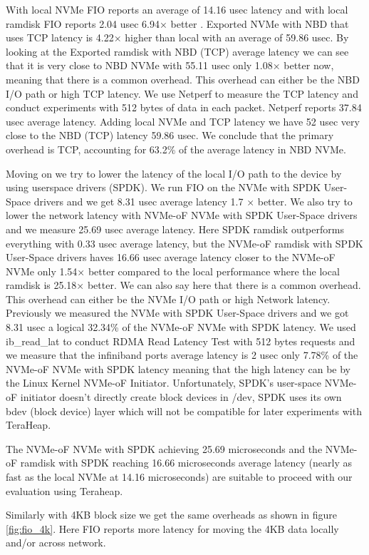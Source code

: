 {With local NVMe  FIO reports an average of 14.16 usec  latency and
with local ramdisk FIO reports 2.04 usec 6.94× better . Exported NVMe  with NBD that uses TCP
 latency is 4.22× higher than local with an average of 59.86 usec. By
looking at the Exported ramdisk with NBD (TCP) average latency we can see that
it is very close to NBD NVMe with 55.11 usec only 1.08× better now, meaning that
there is a common overhead. This overhead can either be the NBD I/O path or high
TCP latency. We use Netperf to measure the TCP latency and conduct experiments
with 512 bytes of data in each packet. Netperf reports 37.84 usec average
latency. Adding local NVMe and TCP latency we have 52 usec very close to the NBD
(TCP) latency 59.86 usec. We conclude that the primary overhead is TCP,
accounting for 63.2\% of the average latency in NBD NVMe.

\par Moving on we try to lower the latency of the local I/O path to the device by using userspace drivers (SPDK). We run FIO on the NVMe with SPDK User-Space drivers and we get 8.31 usec average latency 1.7 × better. We also try to lower the network latency with NVMe-oF NVMe with SPDK User-Space drivers and we measure 25.69 usec average latency. Here SPDK ramdisk outperforms everything with 0.33 usec average latency, but the NVMe-oF ramdisk with SPDK User-Space drivers haves 16.66 usec average latency closer to the NVMe-oF NVMe only 1.54× better compared to the local performance where the local ramdisk is 25.18× better. We can also say here that there is a common overhead. This overhead can either be the NVMe I/O path or high Network latency. Previously we measured the NVMe with SPDK User-Space drivers and we got 8.31 usec a logical 32.34\% of the NVMe-oF NVMe with SPDK latency. We used ib\_read\_lat to conduct RDMA Read Latency Test with 512 bytes requests and we measure that the infiniband ports average latency is 2 usec only 7.78\% of the NVMe-oF NVMe with SPDK latency meaning that the high latency can be by the Linux Kernel NVMe-oF Initiator. Unfortunately, SPDK's user-space NVMe-oF initiator doesn't directly create block devices in /dev, SPDK uses its own bdev (block device) layer which will not be compatible for later experiments with TeraHeap. 
\par The NVMe-oF NVMe with SPDK achieving 25.69 microseconds and the NVMe-oF ramdisk with SPDK reaching 16.66 microseconds average latency (nearly as fast as the local NVMe at 14.16 microseconds) are suitable to proceed with our evaluation using Teraheap.
\par Similarly with 4KB block size we get the same overheads as shown in figure \ref{fig:fio_4k}. Here FIO reports more latency for moving the 4KB data locally and/or across network.

}
